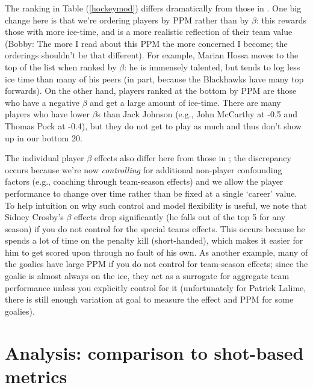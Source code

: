 The ranking in Table (\ref{hockeymod}) differs dramatically from those in
\cite{gramacy:jensen:taddy:2013}.  One big change here is that we're ordering
players by PPM rather than by $\beta$: this rewards those with more ice-time,
and is a more realistic reflection of their team value {\color{red} (Bobby:
The more I read about this PPM the more concerned I become; the orderings
shouldn't be that different)}.  For example, Marian Hossa moves to the top of
the list when ranked by $\beta$: he is immensely talented, but tends to log
less ice time than many of his peers (in part, because the Blackhawks have
many top forwards).  On the other hand, players ranked at the bottom by PPM
are those who have a negative $\beta$ and get a large amount of ice-time.
There are many players who have lower $\beta$s than Jack Johnson (e.g., John
McCarthy at -0.5 and Thomas Pock at -0.4), but they do not get to play as much
and thus don't show up in our bottom 20.

 The individual player
$\beta$ effects also differ here from those in
\cite{gramacy:jensen:taddy:2013}; the discrepancy occurs because we're now
\textit{controlling} for additional non-player confounding factors (e.g.,
coaching through team-season effects) and we allow the player performance to
change over time rather than be fixed at a single `career' value.   To help
intuition on why such control and model flexibility is useful, we note that
Sidney Crosby's $\beta$ effects drop significantly (he falls out of the top 5
for any season) if you do not control for the special teams effects.  This
occurs because he spends a lot of time on the penalty kill (short-handed),
which makes it easier for him to get scored upon through no fault of his own.
As another example, many of the goalies have large PPM if you do not control
for team-season effects; since the goalie is almost always on the ice, they
act as a surrogate for aggregate team performance unless you explicitly
control for it (unfortunately for Patrick Lalime, there is still enough
variation at goal to measure the effect and PPM for some goalies).

\section{Analysis: comparison to shot-based metrics}
\label{sec:shots}


